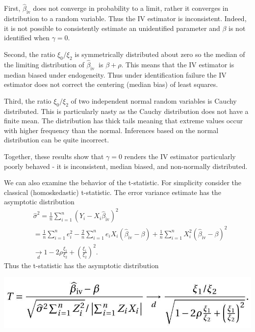 \documentclass[10pt]{article}
\begin{document}
First, $\widehat{\beta}_{\mathrm{iv}}$ does not converge in probability to a limit, rather it converges in distribution to a random variable. Thus the IV estimator is inconsistent. Indeed, it is not possible to consistently estimate an unidentified parameter and $\beta$ is not identified when $\gamma=0$.

Second, the ratio $\xi_{0} / \xi_{2}$ is symmetrically distributed about zero so the median of the limiting distribution of $\widehat{\beta}_{\text {iv }}$ is $\beta+\rho$. This means that the IV estimator is median biased under endogeneity. Thus under identification failure the IV estimator does not correct the centering (median bias) of least squares.

Third, the ratio $\xi_{0} / \xi_{2}$ of two independent normal random variables is Cauchy distributed. This is particularly nasty as the Cauchy distribution does not have a finite mean. The distribution has thick tails meaning that extreme values occur with higher frequency than the normal. Inferences based on the normal distribution can be quite incorrect.

Together, these results show that $\gamma=0$ renders the IV estimator particularly poorly behaved - it is inconsistent, median biased, and non-normally distributed.

We can also examine the behavior of the t-statistic. For simplicity consider the classical (homoskedastic) t-statistic. The error variance estimate has the asymptotic distribution
$$
\begin{aligned}
& \widehat{\sigma}^{2}=\frac{1}{n} \sum_{i=1}^{n}\left(Y_{i}-X_{i} \widehat{\beta}_{\mathrm{iv}}\right)^{2} \\
& =\frac{1}{n} \sum_{i=1}^{n} e_{i}^{2}-\frac{2}{n} \sum_{i=1}^{n} e_{i} X_{i}\left(\widehat{\beta}_{\mathrm{iv}}-\beta\right)+\frac{1}{n} \sum_{i=1}^{n} X_{i}^{2}\left(\widehat{\beta}_{\mathrm{iv}}-\beta\right)^{2} \\
& \underset{d}{\longrightarrow} 1-2 \rho \frac{\xi_{1}}{\xi_{2}}+\left(\frac{\xi_{1}}{\xi_{2}}\right)^{2} \text {. }
\end{aligned}
$$
Thus the t-statistic has the asymptotic distribution

\includegraphics[max width=\textwidth]{2022_09_17_f9391324ededdbb7a34eg-55}
\end{document}
